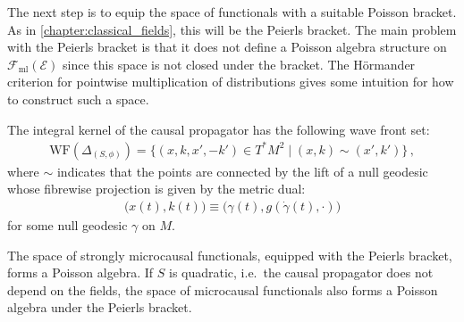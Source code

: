     The next step is to equip the space of functionals with a suitable Poisson bracket. As in \cref{chapter:classical_fields}, this will be the Peierls bracket.
    The main problem with the Peierls bracket is that it does not define a Poisson algebra structure on $\mathcal{F}_{\text{ml}}(\mathcal{E})$ since this space is not closed under the bracket. The H\"ormander criterion for pointwise multiplication of distributions gives some intuition for how to construct such a space.

    \begin{property}\label{aqft:causal_support}
        The integral kernel of the causal propagator has the following wave front set:
        \begin{gather}
            \mathrm{WF}(\Delta_{(S,\phi)}) = \{(x,k,x',-k')\in T^*M^2\mid(x,k)\sim(x',k')\}\,,
        \end{gather}
        where $\sim$ indicates that the points are connected by the lift of a null geodesic whose fibrewise projection is given by the metric dual:
        \begin{gather}
            \bigl(x(t),k(t)\bigr)\equiv\bigl(\gamma(t),g(\dot{\gamma}(t),\cdot)\bigr)
        \end{gather}
        for some null geodesic $\gamma$ on $M$.
    \end{property}

    \begin{property}
        The space of strongly microcausal functionals, equipped with the Peierls bracket, forms a Poisson algebra. If $S$ is quadratic, i.e.~the causal propagator does not depend on the fields, the space of microcausal functionals also forms a Poisson algebra under the Peierls bracket.
    \end{property}

